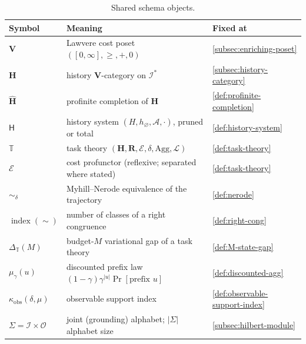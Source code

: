 \documentclass[12pt]{article}
\theoremstyle{definition}
\begin{document}
\begin{table}[htbp]
\centering
\small
\caption{Shared schema objects.}
\label{tab:notation-schema}
\begin{tabular}{@{}p{3.5cm}p{7.7cm}p{2.8cm}@{}}
\toprule
\textbf{Symbol} & \textbf{Meaning} & \textbf{Fixed at} \\
\midrule
$\mathbf V$ & Lawvere cost poset $([0,\infty],\ge,+,0)$ &
\ref{subsec:enriching-poset} \\[2pt]
$\mathbf H$ & history $\mathbf V$-category on $\mathcal I^*$ &
\ref{subsec:history-category} \\[2pt]
$\widehat{\mathbf H}$ & profinite completion of $\mathbf H$ &
\ref{def:profinite-completion} \\[2pt]
$\mathsf H$ & history system $(H,h_\varnothing,\mathcal A,\cdot)$, pruned or
total & \ref{def:history-system} \\[2pt]
$\mathbb T$ & task theory
$(\mathbf H,\mathbf R,\mathcal E,\delta,\mathrm{Agg},\mathcal L)$ &
\ref{def:task-theory} \\[2pt]
$\mathcal E$ & cost profunctor (reflexive; separated where stated) &
\ref{def:task-theory} \\[2pt]
$\sim_\delta$ & Myhill--Nerode equivalence of the trajectory &
\ref{def:nerode} \\[2pt]
$\operatorname{index}(\sim)$ & number of classes of a right congruence &
\ref{def:right-cong} \\[2pt]
$\Delta_{\mathbb T}(M)$ & budget-$M$ variational gap of a task theory &
\ref{def:M-state-gap} \\[2pt]
$\mu_\gamma(u)$ & discounted prefix law
$(1-\gamma)\gamma^{|u|}\Pr[\text{prefix }u]$ &
\ref{def:discounted-agg} \\[2pt]
$\kappa_{\mathrm{obs}}(\delta,\mu)$ & observable support index &
\ref{def:observable-support-index} \\[2pt]
$\Sigma=\mathcal I\times\mathcal O$ & joint (grounding) alphabet; $|\Sigma|$
alphabet size & \ref{subsec:hilbert-module} \\
\bottomrule
\end{tabular}
\end{table}
\end{document}
